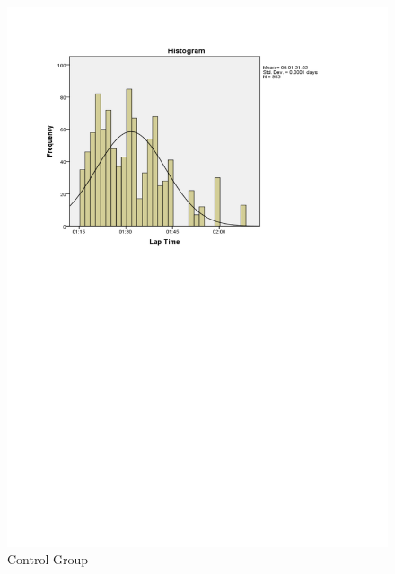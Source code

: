 \begin{figure}
	\centering
	\begin{minipage}{0.45\textwidth}
		\centering
		\includegraphics[width=\textwidth]{charts/3-0}
		Control Group
	\end{minipage}\hfill
	\begin{minipage}{0.45\textwidth}
		\centering

\end{minipage}
\end{figure}
